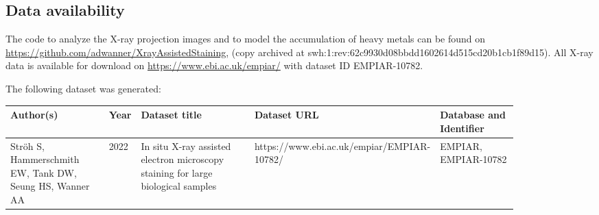 \documentclass{article}
\begin{document}
\subsection*{Data availability}
The code to analyze the X-ray projection images and to model the accumulation of heavy metals can be found on \url{https://github.com/adwanner/XrayAssistedStaining}, (copy archived at swh:1:rev:62c9930d08bbdd1602614d515cd20b1cb1f89d15). All X-ray data is available for download on \url{https://www.ebi.ac.uk/empiar/} with dataset ID EMPIAR-10782.

\noindent The following dataset was generated:

\noindent\begin{tabular}{p{0.2\linewidth}p{0.06\linewidth}p{0.24\linewidth}p{0.2\linewidth}p{0.16\linewidth}}
\toprule
Author(s) & Year & Dataset title & Dataset URL & Database and Identifier\\
\midrule
Ströh S, Hammerschmith EW, Tank DW, Seung HS, Wanner AA & 2022 & In situ X-ray assisted electron microscopy staining for large biological samples & https://www.ebi.ac.uk/empiar/EMPIAR-10782/ & EMPIAR, EMPIAR-10782\\
\bottomrule
\end{tabular}
\end{document}
